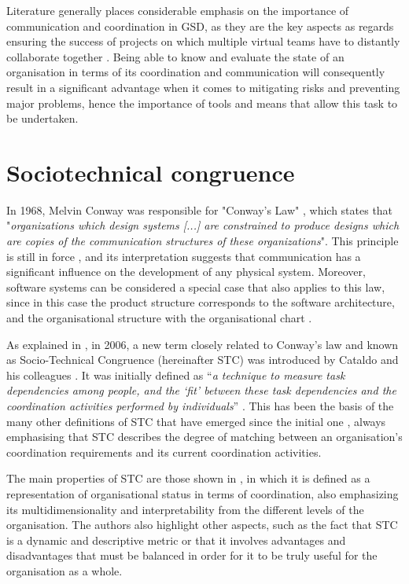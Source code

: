 Literature generally places considerable emphasis on the importance of communication and coordination in GSD, as they are the key aspects as regards ensuring the success of projects on which multiple virtual teams have to distantly collaborate together \cite{malik_geographical_2018, al-zaidi_global_2017}. Being able to know and evaluate the state of an organisation in terms of its coordination and communication will consequently result in a significant advantage when it comes to mitigating risks and preventing major problems, hence the importance of tools and means that allow this task to be undertaken.

\section{Sociotechnical congruence}

In 1968, Melvin Conway was responsible for "Conway's Law" \cite[p.~31]{conway_how_1968}, which states that "\emph{organizations which design systems [...] are constrained to produce designs which are copies of the communication structures of these organizations}". This principle is still in force \cite{kwan_conways_2012, herbsleb_architectures_1999}, and its interpretation suggests that communication has a significant influence on the development of any physical system. Moreover, software systems can be considered a special case that also applies to this law, since in this case the product structure corresponds to the software architecture, and the organisational structure with the organisational chart \cite{kwan_conways_2012}.

As explained in \cite{sierra_systematic_2018}, in 2006, a new term closely related to Conway’s law and known as Socio-Technical Congruence (hereinafter STC) was introduced by Cataldo and his colleagues \cite{cataldo_identification_2006}. It was initially defined as “\emph{a technique to measure task dependencies among people, and the ‘fit’ between these task dependencies and the coordination activities performed by individuals}” \cite[p.~353]{cataldo_identification_2006}. This has been the basis of the many other definitions of STC that have emerged since the initial one \cite{cataldo_socio-technical_2008, kwan_does_2011, kwan_extending_2011, cataldo_coordination_2013, wagstrom_communication_2010, sarma_challenges_2008}, always emphasising that STC describes the degree of matching between an organisation’s coordination requirements and its current coordination activities.

The main properties of STC are those shown in \cite{sarma_challenges_2008}, in which it is defined as a representation of organisational status in terms of coordination, also emphasizing its multidimensionality and interpretability from the different levels of the organisation. The authors also highlight other aspects, such as the fact that STC is a dynamic and descriptive metric or that it involves advantages and disadvantages that must be balanced in order for it to be truly useful for the organisation as a whole.

